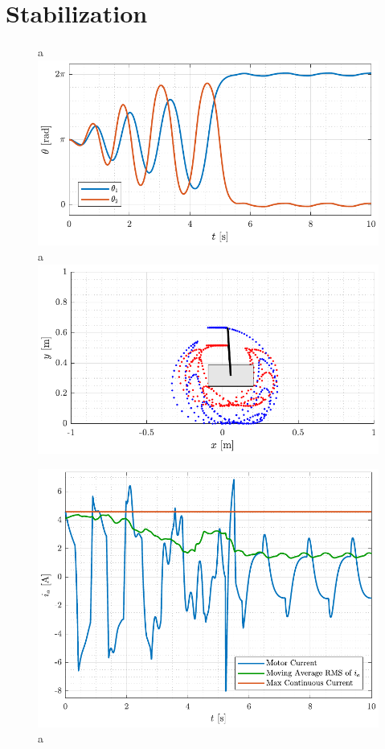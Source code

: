 \chapter{Stabilization}
%
%

\begin{figure}[H]
  \hspace{-10pt}
  \captionbox 
  {
    a
    \label{fig:theta_twinSwingAndCatch}
  }
  {
    \hspace{-1cm}
    \includegraphics[width=.46\textwidth]{figures/theta_twinSwingAndCatch}
  }
  \hspace{20pt}
  \captionbox 
  {
    a
    \label{fig:ani_twinSwingAndCatch}
  }
  {
    \hspace{-1cm}
    \includegraphics[width=.46\textwidth]{figures/ani_twinSwingAndCatch}
  }
\end{figure}
%
%
\begin{figure}[H]
  \includegraphics[width=.5\textwidth]{figures/ia_twinSwingAndCatch}
  \caption{a}
  \label{fig:ia_twinSwingAndCatch}
\end{figure}

